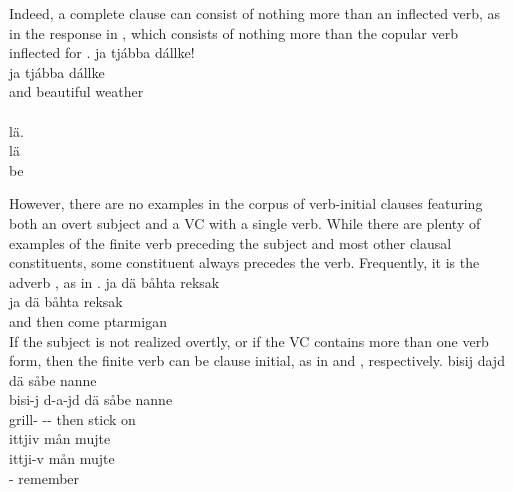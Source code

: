 Indeed, a complete clause can consist of nothing more than an inflected verb, as in the response %
in , which consists of nothing more than the copular verb inflected for .
\ea\label{missingNP5}
\glll	{} ja tjábba dállke!\\
	{} ja tjábba dállke\\
	{} and beautiful weather\BS{} \\\nopagebreak
{}\\ %
\glll	{} lä.\\
	{} lä\\
	{} be\BS{}\\\nopagebreak
{} %
\z
{} 

However, there are no examples in the corpus of verb-initial clauses featuring both an overt subject and a VC with a single verb. While there are plenty of examples of the finite verb preceding the subject and most other clausal constituents, some constituent always precedes the verb. Frequently, it is the adverb , as in . 
\ea\label{ConstOrderAdvVex1}%
\glll	ja dä båhta reksak\\
	ja dä båhta reksak\\
	and then come\BS{} ptarmigan\BS{} \\\nopagebreak
{} 
\z
If the subject is not realized overtly, or if the VC contains more than one verb form, then the finite verb can be clause initial, as in  and , respectively. 
\ea\label{ConstOrderAdvVex2}%
\glll	bisij dajd dä såbe nanne\\
	bisi-j d-a-jd dä såbe nanne\\
	grill- -- then stick\BS{} on\\\nopagebreak
{} 
\z
\ea\label{ConstOrderAdvVex3}%
\glll	ittjiv mån mujte\\
	ittji-v mån mujte\\
	-  remember\BS{} \\\nopagebreak
{} 
\z


